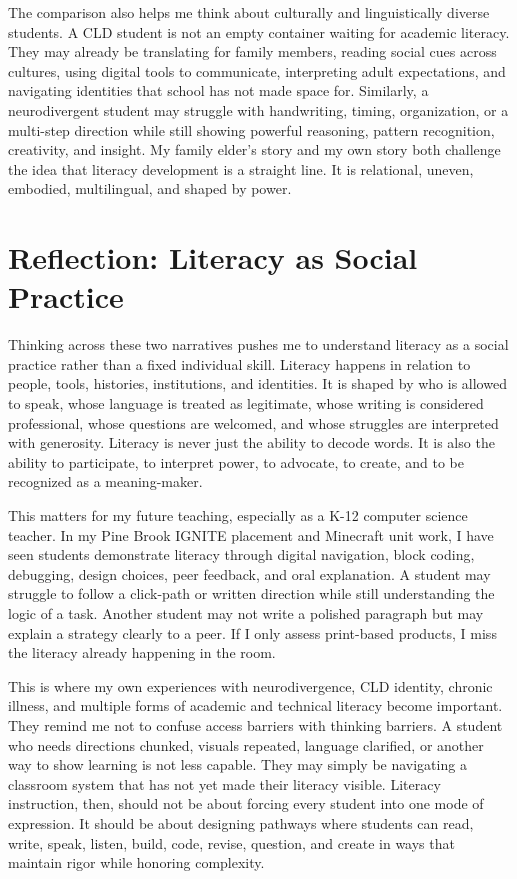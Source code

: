 \documentclass[11pt]{article}
\begin{document}
The comparison also helps me think about culturally and linguistically diverse students. A CLD student is not an empty container waiting for academic literacy. They may already be translating for family members, reading social cues across cultures, using digital tools to communicate, interpreting adult expectations, and navigating identities that school has not made space for. Similarly, a neurodivergent student may struggle with handwriting, timing, organization, or a multi-step direction while still showing powerful reasoning, pattern recognition, creativity, and insight. My family elder's story and my own story both challenge the idea that literacy development is a straight line. It is relational, uneven, embodied, multilingual, and shaped by power.

\section*{Reflection: Literacy as Social Practice}

Thinking across these two narratives pushes me to understand literacy as a social practice rather than a fixed individual skill. Literacy happens in relation to people, tools, histories, institutions, and identities. It is shaped by who is allowed to speak, whose language is treated as legitimate, whose writing is considered professional, whose questions are welcomed, and whose struggles are interpreted with generosity. Literacy is never just the ability to decode words. It is also the ability to participate, to interpret power, to advocate, to create, and to be recognized as a meaning-maker.

This matters for my future teaching, especially as a K-12 computer science teacher. In my Pine Brook IGNITE placement and Minecraft unit work, I have seen students demonstrate literacy through digital navigation, block coding, debugging, design choices, peer feedback, and oral explanation. A student may struggle to follow a click-path or written direction while still understanding the logic of a task. Another student may not write a polished paragraph but may explain a strategy clearly to a peer. If I only assess print-based products, I miss the literacy already happening in the room.

This is where my own experiences with neurodivergence, CLD identity, chronic illness, and multiple forms of academic and technical literacy become important. They remind me not to confuse access barriers with thinking barriers. A student who needs directions chunked, visuals repeated, language clarified, or another way to show learning is not less capable. They may simply be navigating a classroom system that has not yet made their literacy visible. Literacy instruction, then, should not be about forcing every student into one mode of expression. It should be about designing pathways where students can read, write, speak, listen, build, code, revise, question, and create in ways that maintain rigor while honoring complexity.
\end{document}
